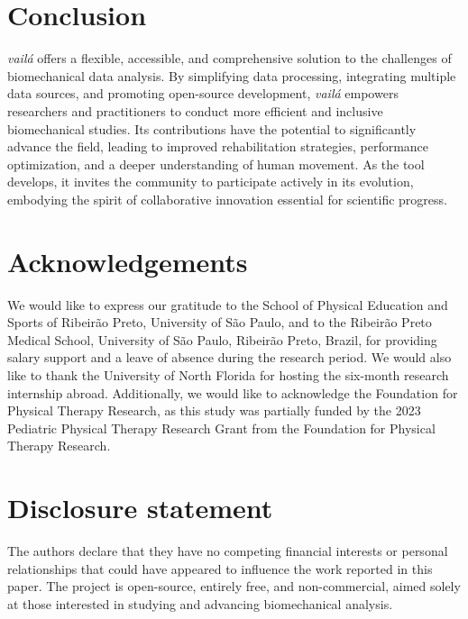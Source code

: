 \documentclass{article}
\begin{document}
\section{Conclusion}

\textit{vailá} offers a flexible, accessible, and comprehensive solution to the challenges of biomechanical data analysis. By simplifying data processing, integrating multiple data sources, and promoting open-source development, \textit{vailá} empowers researchers and practitioners to conduct more efficient and inclusive biomechanical studies. Its contributions have the potential to significantly advance the field, leading to improved rehabilitation strategies, performance optimization, and a deeper understanding of human movement. As the tool develops, it invites the community to participate actively in its evolution, embodying the spirit of collaborative innovation essential for scientific progress.
\section*{Acknowledgements}

We would like to express our gratitude to the School of Physical Education and Sports of Ribeirão Preto, University of São Paulo, and to the Ribeirão Preto Medical School, University of São Paulo, Ribeirão Preto, Brazil, for providing salary support and a leave of absence during the research period. We would also like to thank the University of North Florida for hosting the six-month research internship abroad. Additionally, we would like to acknowledge the Foundation for Physical Therapy Research, as this study was partially funded by the 2023 Pediatric Physical Therapy Research Grant from the Foundation for Physical Therapy Research. 

\section*{Disclosure statement}

The authors declare that they have no competing financial interests or personal relationships that could have appeared to influence the work reported in this paper. The project is open-source, entirely free, and non-commercial, aimed solely at those interested in studying and advancing biomechanical analysis.
\end{document}
